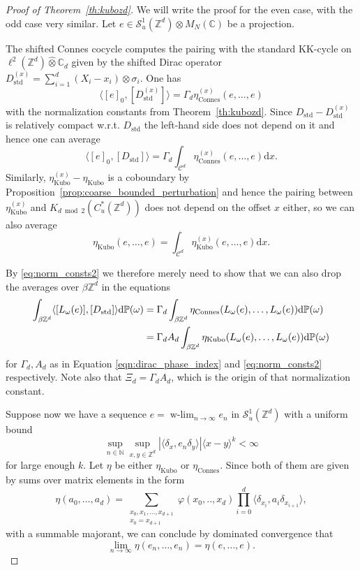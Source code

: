 \documentclass[12pt]{amsart}
\newcommand{\CM}{{\mathbb C}}
\newcommand{\NM}{{\mathbb N}}
\newcommand{\ZM}{{\mathbb Z}}
\newcommand{\PM}{{\mathbb P}}
\newcommand{\Ss}{{\mathcal S}}
\newcommand{\Cc}{{\mathcal C}}
\newcommand{\difd}{\textup{d}}
\DeclareMathOperator*{\wlim}{w-lim}
\begin{document}
\begin{proof}[Proof of Theorem~\ref{th:kubozd}]
We will write the proof for the even case, with the odd case very similar. Let $e\in \Ss_u^1(\ZM^d)\otimes M_N(\CM)$ be a projection.

The shifted Connes cocycle computes the pairing with the standard KK-cycle on $\ell^2(\ZM^d)\hat{\otimes}\CM_d$ given by the shifted Dirac operator $D^{(x)}_{\mathrm{std}}= \sum_{i=1}^d (X_i-x_i)\otimes \sigma_i$. One has \cite[Section 6.3, 6.4]{ProdanSchulzBaldes2016B}
$$\langle [e]_0, [D^{(x)}_{\mathrm{std}}]\rangle = \Gamma_d \eta^{(x)}_{\mathrm{Connes}}(e,\dots,e)$$
with the normalization constants from Theorem~\ref{th:kubozd}. Since $D_{\mathrm{std}}-D^{(x)}_{\mathrm{std}}$ is relatively compact w.r.t. $D_{\mathrm{std}}$ the left-hand side does not depend on it and hence one can average
$$\langle [e]_0 , [D_{\mathrm{std}}] \rangle= \Gamma_d \int_{\Cc^d}\eta^{(x)}_{\mathrm{Connes}}(e,\dots,e) \mathrm{d}x.$$
Similarly, $\eta^{(x)}_{\mathrm{Kubo}}-\eta_{\mathrm{Kubo}}$ is a coboundary by Proposition~\ref{prop:coarse_bounded_perturbation} and hence the pairing between $\eta^{(x)}_{\mathrm{Kubo}}$ and $K_{d \bmod 2}(C^*_u(\ZM^d))$ does not depend on the offset $x$ either, so we can also average
$$\eta_{\mathrm{Kubo}}(e,\dots,e)= \int_{\Cc^d}\eta^{(x)}_{\mathrm{Kubo}}(e,\dots,e) \mathrm{d}x.$$

By \eqref{eq:norm_consts2} we therefore merely need to show that we can also drop the averages over $\beta\ZM^d$ in the equations
\begin{align*}
\int_{\beta\ZM^d} \langle [L_\omega(e)], [D_{\mathrm{std}}]\rangle \difd{\PM(\omega)}&=\Gamma_d \int_{\beta\ZM^d}  \eta_{\mathrm{Connes}}(L_\omega(e),\dots,L_\omega(e))\difd{\PM(\omega)} \\
&= \Gamma_d A_d \int_{\beta\ZM^d}  \eta_{\mathrm{Kubo}}(L_\omega(e),\dots,L_\omega(e))\difd{\PM(\omega)}
\end{align*}
for $\Gamma_d, A_d$ as in Equation \eqref{eqn:dirac_phase_index} and \eqref{eq:norm_consts2} respectively. Note also that $\Xi_d = \Gamma_d A_d$, which is the origin of that normalization constant.

Suppose now we have a sequence $e = \wlim_{n\to \infty} e_n$ in $\Ss_u^1(\ZM^d)$ with a uniform bound 
$$\sup_{n\in \NM} \sup_{x,y\in \ZM^d} |\langle \delta_x, e_n \delta_y\rangle| \langle x-y\rangle^k < \infty$$
for large enough $k$. Let $\eta$ be either $\eta_{\mathrm{Kubo}}$ or $\eta_{\mathrm{Connes}}$. Since both of them are given by sums over matrix elements in the form $$\eta(a_0,\dots,a_d)=\sum_{\substack{x_0,x_1,\dots,x_{d+1}\\ x_0=x_{d+1}}} \varphi(x_0,..,x_d) \prod_{i=0}^d\langle\delta_{x_i}, a_i  \delta_{x_{i+1}}\rangle,$$
with a summable majorant, we can conclude by dominated convergence that
$$\lim_{n\to \infty} \eta(e_n,\dots,e_n)= \eta(e,\dots,e).$$


\end{proof}
\end{document}
